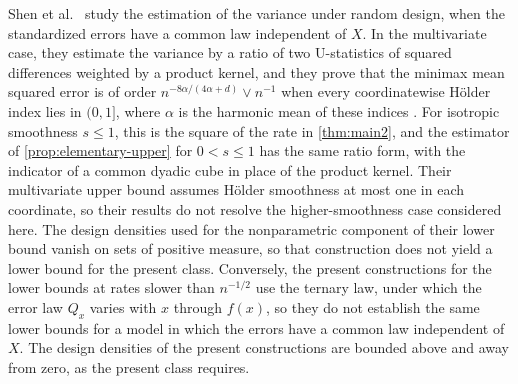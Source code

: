 Shen et al.\ \cite{ShenGaoWittenHan2020} study the estimation of the
variance under random design, when the standardized errors have a
common law independent of $X$. In
the multivariate case, they estimate the variance by a ratio of two
U-statistics of squared differences weighted by a product kernel, and
they prove that the minimax mean squared error is of order
$n^{-8\alpha/(4\alpha+d)}\vee n^{-1}$ when every coordinatewise H\"older
index lies in $(0,1]$, where $\alpha$ is the harmonic mean of these
indices \cite[Section~4.1]{ShenGaoWittenHan2020}. For isotropic
smoothness $s\le1$, this is the square of the rate in \cref{thm:main2},
and the estimator of \cref{prop:elementary-upper} for $0<s\le1$ has
the same ratio form, with the indicator of a common dyadic cube in
place of the product kernel. Their multivariate upper bound
\cite[Section~4.1, Proposition~1]{ShenGaoWittenHan2020} assumes
H\"older smoothness at most one in each coordinate, so their results do
not resolve the higher-smoothness case considered here. The design
densities used for the nonparametric component of their lower bound
vanish on sets of positive measure, so that construction does not yield
a lower bound for the present class. Conversely, the present
constructions for the lower bounds at rates slower than $n^{-1/2}$ use
the ternary law, under which the error law $Q_x$ varies with $x$ through
$f(x)$, so they do not establish the same lower bounds for a model in
which the errors have a common law independent of $X$. The design densities of the
present constructions are bounded above and away from zero, as the
present class requires.

